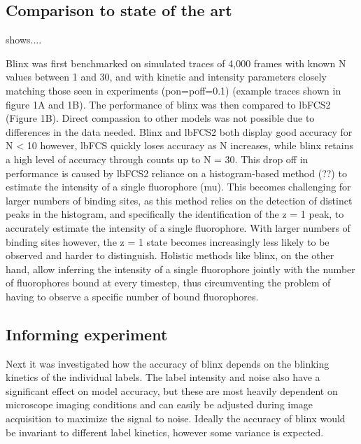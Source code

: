 \subsection{Comparison to state of the art \lbfcs}

 shows....

Blinx was first benchmarked on simulated traces of 4,000 frames with known N
values between 1 and 30, and with kinetic and intensity parameters closely
matching those seen in experiments (pon=poff=0.1) (example traces shown in
figure 1A and 1B). The performance of blinx was then compared to lbFCS2 (Figure
1B). Direct compassion to other models was not possible due to differences in
the data needed. Blinx and lbFCS2 both display good accuracy for N < 10
however, lbFCS quickly loses accuracy as N increases, while blinx retains a
high level of accuracy through counts up to N = 30. This drop off in
performance is caused by lbFCS2 reliance on a histogram-based method (??) to
estimate the intensity of a single fluorophore (mu). This becomes challenging
for larger numbers of binding sites, as this method relies on the detection of
distinct peaks in the histogram, and specifically the identification of the z =
1 peak, to accurately estimate the intensity of a single fluorophore. With
larger numbers of binding sites however, the z = 1 state becomes increasingly
less likely to be observed and harder to distinguish. Holistic methods like
blinx, on the other hand, allow inferring the intensity of a single fluorophore
jointly with the number of fluorophores bound at every timestep, thus
circumventing the problem of having to observe a specific number of bound
fluorophores.

\subsection{Informing experiment}

Next it was investigated how the accuracy of blinx depends on the blinking
kinetics of the individual labels. The label intensity and noise also have a
significant effect on model accuracy, but these are most heavily dependent on
microscope imaging conditions and can easily be adjusted during image
acquisition to maximize the signal to noise. Ideally the accuracy of blinx
would be invariant to different label kinetics, however some variance is
expected.

